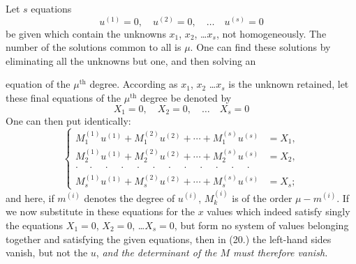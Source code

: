 \documentclass{article}
\begin{document}
Let $s$ equations
\[
u^{(1)}=0, \quad u^{(2)}=0, \quad \ldots \quad u^{(s)}=0
\]
be given which contain the unknowns $x_{1}$, $x_{2}$, \ldots $x_{s}$, not homogeneously. The number of the solutions common to all is $\mu$. One can find these solutions by eliminating all the unknowns but one, and then solving an

equation of the $\mu^{\text{th}}$ degree. According as $x_{1}$, $x_{2}$ \ldots $x_{s}$ is the unknown retained, let these final equations of the $\mu^{\text{th}}$ degree be denoted by
\[
X_{1}=0, \quad X_{2}=0, \quad \ldots \quad X_{s}=0
\]
One can then put identically:
\[
\left\{
\begin{aligned}
M_{1}^{(1)}u^{(1)}+M_{1}^{(2)}u^{(2)}+\cdots+M_{1}^{(s)}u^{(s)} &= X_{1},\\
M_{2}^{(1)}u^{(1)}+M_{2}^{(2)}u^{(2)}+\cdots+M_{2}^{(s)}u^{(s)} &= X_{2},\\
\cdot\quad\cdot\quad\cdot\quad\cdot\quad\cdot\quad\cdot\quad\cdot\quad\cdot\quad\cdot\quad\cdot\quad\cdot\quad\cdot & \\
M_{s}^{(1)}u^{(1)}+M_{s}^{(2)}u^{(2)}+\cdots+M_{s}^{(s)}u^{(s)} &= X_{s};
\end{aligned}
\right. \tag{20.}
\]
and here, if $m^{(i)}$ denotes the degree of $u^{(i)}$, $M_{k}^{(i)}$ is of the order $\mu-m^{(i)}$. If we now substitute in these equations for the $x$ values which indeed satisfy singly the equations $X_{1}=0$, $X_{2}=0$, \ldots $X_{s}=0$, but form no system of values belonging together and satisfying the given equations, then in (20.) the left-hand sides vanish, but not the $u$, \emph{and the determinant of the $M$ must therefore vanish.}
\end{document}

